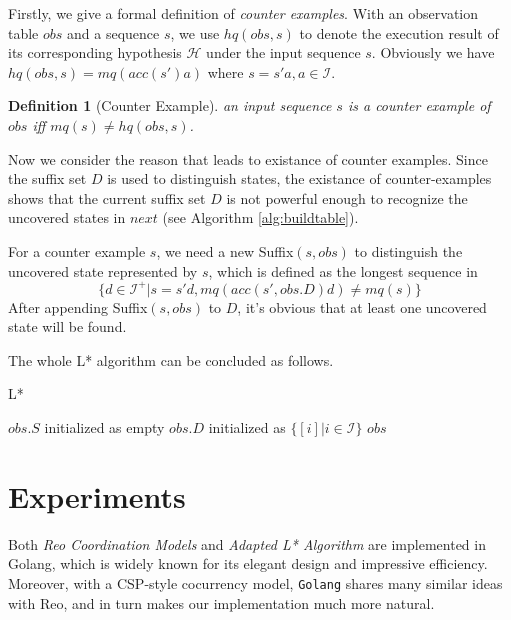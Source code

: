 \documentclass[conference, a4paper]{IEEEtran}
\newtheorem{definition}{Definition}
\begin{document}
Firstly, we give a formal definition of \emph{counter examples}. With an observation table $obs$ and
a sequence $s$, we use $hq(obs,s)$ to denote the execution result of its corresponding hypothesis
$\mathcal{H}$ under the input sequence
$s$. Obviously we have $hq(obs,s) = mq(acc(s')a)$ where $s=s'a,a\in\mathcal{I}$.

\begin{definition}[Counter Example]
  an input sequence $s$ is a counter example of $obs$ iff $mq(s)\neq hq(obs,s)$.
\end{definition}

Now we consider the reason that leads to existance of counter examples. Since
the suffix set $D$ is used to distinguish states, the existance of counter-examples
shows that the current suffix set $D$ is not powerful enough to recognize the uncovered states in
$next$ (see Algorithm \ref{alg:buildtable}).

For a counter example $s$, we need a new Suffix$(s,obs)$ to distinguish the uncovered state
represented by $s$, which is defined as the longest sequence in
\[
\{d\in\mathcal{I}^+|s=s'd, mq(acc(s',obs.D)d)\neq mq(s)\}
\]
After appending Suffix$(s,obs)$ to $D$, it's obvious that at least one uncovered state will be found.

The whole L* algorithm can be concluded as follows.
\begin{algorithm} 
  \caption{L*} 
  \label{alg:lstar}
  $obs.S$ initialized as empty\;
  $obs.D$ initialized as $\{[i]|i\in\mathcal{I}\}$\;
  \Return $obs$\; 
\end{algorithm}




\section{Experiments} 
\label{sec:experiment}

Both \emph{Reo Coordination Models} and \emph{Adapted L* Algorithm} are implemented in
Golang\cite{golang}, which is widely known for its elegant design and impressive efficiency.
Moreover, with a CSP-style\cite{DBLP:books/ph/Hoare85} cocurrency model, \texttt{Golang} shares many
similar ideas with Reo, and in turn makes our implementation much more natural.
\end{document}
